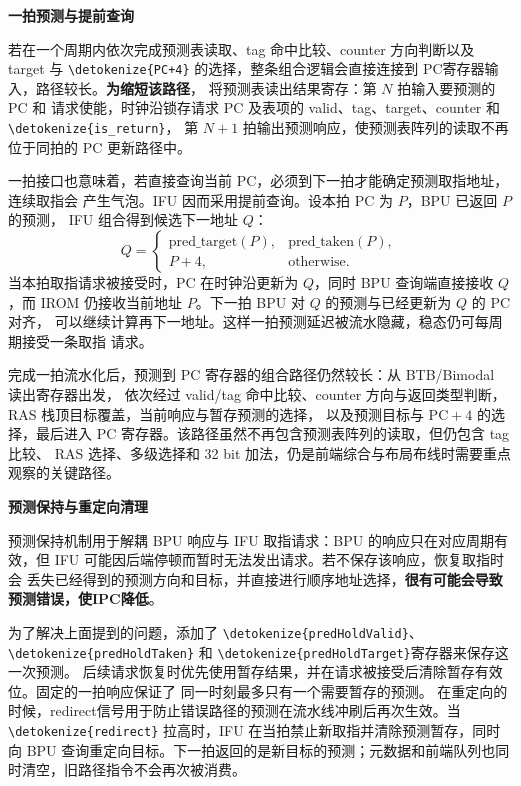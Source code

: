 \documentclass[UTF8,a4paper,12pt,fontset=none,scheme=plain]{ctexart}
\newcommand{\id}[1]{{\urlstyle{rm}\expandafter\nolinkurl\expandafter{\detokenize{#1}}}}
\begin{document}
\medskip
\noindent\textbf{一拍预测与提前查询}\par

若在一个周期内依次完成预测表读取、tag 命中比较、counter 方向判断以及 target 与
\id{PC+4} 的选择，整条组合逻辑会直接连接到 PC寄存器输入，路径较长。\textbf{为缩短该路径}，
将预测表读出结果寄存：第 $N$ 拍输入要预测的 PC 和
请求使能，时钟沿锁存请求 PC 及表项的 valid、tag、target、counter 和
\id{is_return}，
第 $N+1$ 拍输出预测响应，使预测表阵列的读取不再位于同拍的 PC 更新路径中。

一拍接口也意味着，若直接查询当前 PC，必须到下一拍才能确定预测取指地址，连续取指会
产生气泡。IFU 因而采用提前查询。设本拍 PC 为 $P$，BPU 已返回 $P$ 的预测，
IFU 组合得到候选下一地址 $Q$：
\begin{equation}
  Q=\begin{cases}
    \mathrm{pred\_target}(P), & \mathrm{pred\_taken}(P),\\
    P+4, & \text{otherwise}.
  \end{cases}
\end{equation}
当本拍取指请求被接受时，PC 在时钟沿更新为 $Q$，同时 BPU 查询端直接接收 $Q$，而
IROM 仍接收当前地址 $P$。下一拍 BPU 对 $Q$ 的预测与已经更新为 $Q$ 的 PC 对齐，
可以继续计算再下一地址。这样一拍预测延迟被流水隐藏，稳态仍可每周期接受一条取指
请求。

完成一拍流水化后，预测到 PC 寄存器的组合路径仍然较长：从 BTB/Bimodal 读出寄存器出发，
依次经过 valid/tag 命中比较、counter 方向与返回类型判断，RAS 栈顶目标覆盖，当前响应与暂存预测的选择，
以及预测目标与 $\mathrm{PC}+4$ 的选择，最后进入 PC 寄存器。该路径虽然不再包含预测表阵列的读取，但仍包含 tag 比较、
RAS 选择、多级选择和 32 bit 加法，仍是前端综合与布局布线时需要重点观察的关键路径。

\medskip
\noindent\textbf{预测保持与重定向清理}\par

预测保持机制用于解耦 BPU 响应与 IFU 取指请求：BPU 的响应只在对应周期有效，但 IFU
可能因后端停顿而暂时无法发出请求。若不保存该响应，恢复取指时会
丢失已经得到的预测方向和目标，并直接进行顺序地址选择，\textbf{很有可能会导致预测错误，使IPC降低}。

为了解决上面提到的问题，添加了
\id{predHoldValid}、\id{predHoldTaken} 和 \id{predHoldTarget}寄存器来保存这一次预测。
后续请求恢复时优先使用暂存结果，并在请求被接受后清除暂存有效位。固定的一拍响应保证了
同一时刻最多只有一个需要暂存的预测。
在重定向的时候，redirect信号用于防止错误路径的预测在流水线冲刷后再次生效。当\id{redirect} 拉高时，IFU
在当拍禁止新取指并清除预测暂存，同时向 BPU 查询重定向目标。下一拍返回的是新目标的预测；元数据和前端队列也同时清空，旧路径指令不会再次被消费。
\end{document}
